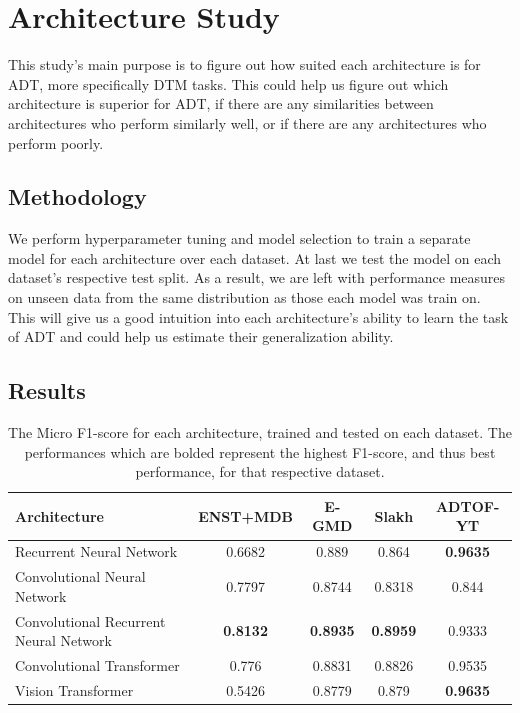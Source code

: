 \chapter{Architecture Study}

This study's main purpose is to figure out how suited each architecture is for \gls{ADT}, more specifically \gls{DTM} tasks. This could help us figure out which architecture is superior for \gls{ADT}, if there are any similarities between architectures who perform similarly well, or if there are any architectures who perform poorly.

\section{Methodology}

We perform hyperparameter tuning and model selection to train a separate model for each architecture over each dataset. At last we test the model on each dataset's respective test split. As a result, we are left with performance measures on unseen data from the same distribution as those each model was train on. This will give us a good intuition into each architecture's ability to learn the task of \gls{ADT} and could help us estimate their generalization ability.

\section{Results}	

\begin{table}[H]
    \centering
    \hspace*{-0.6cm}
    \begin{tabular}{l|cccc}
        Architecture & ENST+MDB & E-GMD & Slakh & ADTOF-YT       \\
        \hline
        Recurrent Neural Network	& 0.6682 &	0.889 &	0.864 &	\textbf{0.9635} \\
        Convolutional Neural Network	& 0.7797 &	0.8744 &	0.8318 &	0.844 \\
        Convolutional Recurrent Neural Network	& \textbf{0.8132} &	\textbf{0.8935} &	\textbf{0.8959} &	0.9333 \\
        Convolutional Transformer	& 0.776 &	0.8831 &	0.8826 &	0.9535 \\
        Vision Transformer	& 0.5426 &	0.8779 &	0.879 &	\textbf{0.9635} \\
        
    \end{tabular}
    \caption{The Micro F1-score for each architecture, trained and tested on each dataset. The performances which are bolded represent the highest F1-score, and thus best performance, for that respective dataset.}
    \label{ArchitectureResultsTable}
\end{table}


